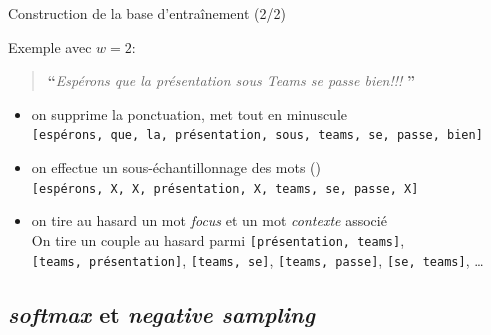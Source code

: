 \documentclass[10pt,xcolor=table,color={dvipsnames,usenames},ignorenonframetext,usepdftitle=false,french]{beamer}
\begin{document}
\begin{frame}[fragile]{Construction de la base d'entraînement (2/2)}
\protect\hypertarget{construction-de-la-base-dentrauxeenement-22}{}

Exemple avec \(w=2\):

\begin{quote}
\LARGE \textbf{``}\normalsize \emph{Espérons que la présentation sous Teams se passe bien!!!} \LARGE \textbf{''}\normalsize
\end{quote}

\begin{itemize}
\item
  on supprime la ponctuation, met tout en minuscule\\
  \faArrowCircleRight{}
  \texttt{{[}espérons,\ que,\ la,\ présentation,\ sous,\ teams,\ se,\ passe,\ bien{]}}
  \pause
\item
  on effectue un sous-échantillonnage des mots
  ()\\
  \faArrowCircleRight{}
  \texttt{{[}espérons,\ X,\ X,\ présentation,\ X,\ teams,\ se,\ passe,\ X{]}}
  \pause
\item
  on tire au hasard un mot \emph{focus} et un mot \emph{contexte}
  associé\\
  \faArrowCircleRight{} On tire un couple au hasard parmi
  \texttt{{[}présentation,\ teams{]}},
  \texttt{{[}teams,\ présentation{]}}, \texttt{{[}teams,\ se{]}},
  \texttt{{[}teams,\ passe{]}}, \texttt{{[}se,\ teams{]}}, \dots
\end{itemize}

\end{frame}

\hypertarget{softmax-et-negative-sampling}{%
\subsection{\texorpdfstring{\emph{softmax} et \emph{negative
sampling}}{softmax et negative sampling}}\label{softmax-et-negative-sampling}}
\end{document}
